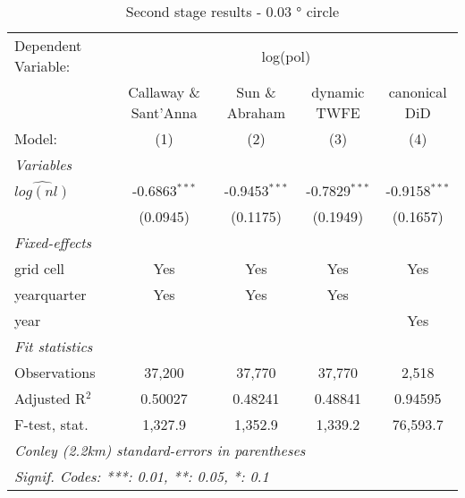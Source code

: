 
\begin{table}[ht]
   \caption{\label{tab:estimates0.03} Second stage results - 0.03 ° circle}
   \centering
   \begin{adjustbox}{width = \textwidth, center}
      \begin{tabular}{lcccc}
         \tabularnewline \midrule \midrule
         Dependent Variable: & \multicolumn{4}{c}{log(pol)}\\
          & Callaway \& Sant'Anna & Sun \& Abraham & dynamic TWFE & canonical DiD \\ 
         Model:               & (1)             & (2)             & (3)             & (4)\\  
         \midrule
         \emph{Variables}\\
         $\widehat{log(nl)}$  & -0.6863$^{***}$ & -0.9453$^{***}$ & -0.7829$^{***}$ & -0.9158$^{***}$\\   
                              & (0.0945)        & (0.1175)        & (0.1949)        & (0.1657)\\   
         \midrule
         \emph{Fixed-effects}\\
         grid cell            & Yes             & Yes             & Yes             & Yes\\  
         yearquarter          & Yes             & Yes             & Yes             & \\  
         year                 &                 &                 &                 & Yes\\  
         \midrule
         \emph{Fit statistics}\\
         Observations         & 37,200          & 37,770          & 37,770          & 2,518\\  
         Adjusted R$^2$       & 0.50027         & 0.48241         & 0.48841         & 0.94595\\  
         F-test, stat.        & 1,327.9         & 1,352.9         & 1,339.2         & 76,593.7\\  
         \midrule \midrule
         \multicolumn{5}{l}{\emph{Conley (2.2km) standard-errors in parentheses}}\\
         \multicolumn{5}{l}{\emph{Signif. Codes: ***: 0.01, **: 0.05, *: 0.1}}\\
      \end{tabular}
   \end{adjustbox}
\end{table}


